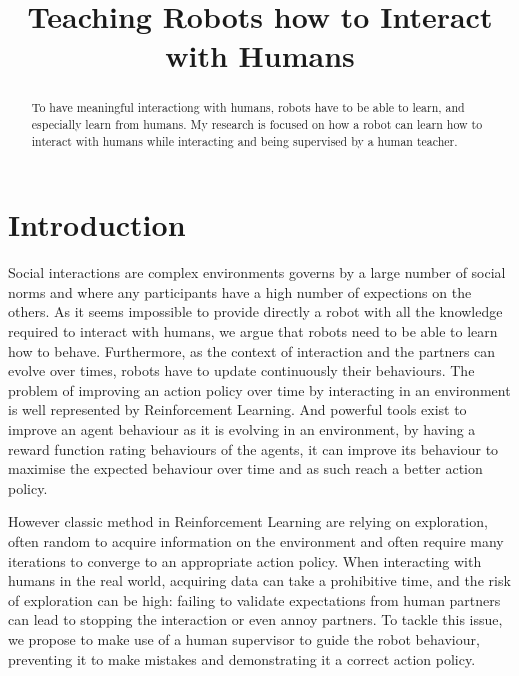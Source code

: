 \documentclass[conference]{IEEEtran}
\begin{document}
\title{Teaching Robots how to Interact with Humans}

\author{
}

\maketitle

\begin{abstract}

To have meaningful interactiong with humans, robots have to be able to learn,
    and especially learn from humans. My research is focused on how a robot can
    learn how to interact with humans while interacting and being supervised by
    a human teacher.

\end{abstract}

\section{Introduction}

Social interactions are complex environments governs by a large number of social
norms and where any participants have a high number of expections on the others.
As it seems impossible to provide directly a robot with all the knowledge
required to interact with humans, we argue that robots need to be able to learn
how to behave. Furthermore, as the context of interaction and the partners can
evolve over times, robots have to update continuously their behaviours.  The
problem of improving an action policy over time by interacting in an environment
is well represented by Reinforcement Learning. And powerful tools exist to
improve an agent behaviour as it is evolving in an environment, by having a
reward function rating behaviours of the agents, it can improve its behaviour to
maximise the expected behaviour over time and as such reach a better action
policy. 

However classic method in Reinforcement Learning are relying on exploration,
often random to acquire information on the environment and often require many
iterations to converge to an appropriate action policy. When interacting with
humans in the real world, acquiring data can take a prohibitive time, and the
risk of exploration can be high: failing to validate expectations from human
partners can lead to stopping the interaction or even annoy partners. To tackle
this issue, we propose to make use of a human supervisor to guide the robot
behaviour, preventing it to make mistakes and demonstrating it a correct action
policy.
\end{document}
